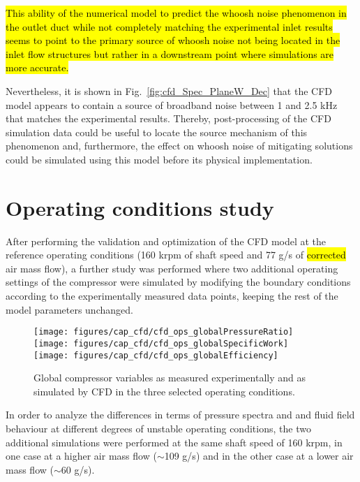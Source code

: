 \hl{This ability of the numerical model to predict the whoosh noise phenomenon in the outlet duct while not completely matching the experimental inlet results seems to point to the primary source of whoosh noise not being located in the inlet flow structures but rather in a downstream point where simulations are more accurate.}

Nevertheless, it is shown in Fig.~\ref{fig:cfd_Spec_PlaneW_Dec} that the CFD model appears to contain a source of broadband noise between 1 and 2.5 kHz that matches the experimental results. Thereby, post-processing of the CFD simulation data could be useful to locate the source mechanism of this phenomenon and, furthermore, the effect on whoosh noise of mitigating solutions could be simulated using this model before its physical implementation. 

\section{Operating conditions study} %

After performing the validation and optimization of the CFD model at the reference operating conditions (160 krpm of shaft speed and 77 g/s of \hl{corrected} air mass flow), a further study was performed where two additional operating settings of the compressor were simulated by modifying the boundary conditions according to the experimentally measured data points, keeping the rest of the model parameters unchanged.

\begin{wrapfigure}[27]{l}[0.8cm]{0.45\textwidth}
\vspace{-4mm}
\centering
\texttt{[image: figures/cap\_cfd/cfd\_ops\_globalPressureRatio]}\\[4mm]
\texttt{[image: figures/cap\_cfd/cfd\_ops\_globalSpecificWork]}\\[4mm]
\texttt{[image: figures/cap\_cfd/cfd\_ops\_globalEfficiency]}\\[2mm]
\caption{Global compressor variables as measured experimentally and as simulated by CFD in the three selected operating conditions.}
\label{fig:cfd_ops_globals}
\end{wrapfigure}

In order to analyze the differences in terms of pressure spectra and and fluid field behaviour at different degrees of unstable operating conditions, the two additional simulations were performed at the same shaft speed of 160 krpm, in one case at a higher air mass flow  ($\sim$109 g/s) and in the other case at a lower air mass flow ($\sim$60 g/s).

